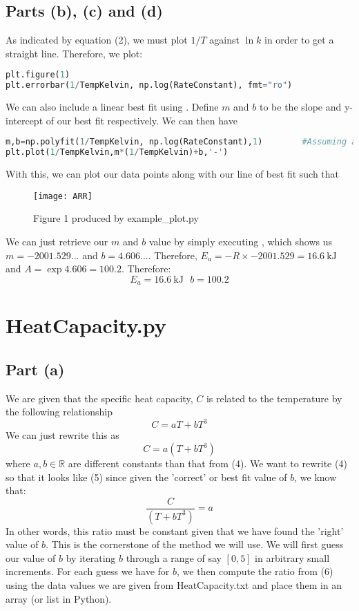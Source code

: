 \documentclass[11pt, oneside]{article}
\begin{document}
\subsection{Parts (b), (c) and (d)}
As indicated by equation (2), we must plot $1/T$ against $\ln{k}$ in order to get a straight line. Therefore, we plot:
\begin{lstlisting}[language=Python, caption=Plotting RateT.txt in an Arrhenius plot]
plt.figure(1)
plt.errorbar(1/TempKelvin, np.log(RateConstant), fmt="ro")		
\end{lstlisting}
We can also include a linear best fit using . Define $m$ and $b$ to be the slope and y-intercept of our best fit respectively. We can then have
\begin{lstlisting}[language=Python, caption=Determining and plotting the line of best fit (linear regression)]
m,b=np.polyfit(1/TempKelvin, np.log(RateConstant),1)		#Assuming a linear best fit
plt.plot(1/TempKelvin,m*(1/TempKelvin)+b,'-')		
\end{lstlisting}
With this, we can plot our data points along with our line of best fit such that
\begin{figure}[H]
\texttt{[image: ARR]}
\centering
\caption{Figure 1 produced by example\_plot.py}
\end{figure}
\noindent
We can just retrieve our $m$ and $b$ value by simply executing , which shows us $m=-2001.529...$ and $b=4.606...$. Therefore, $E_a=-R\times -2001.529=16.6\ \text{kJ}$ and $A=\exp{4.606}=100.2$. Therefore:
\begin{equation}
\boxed{E_a=16.6\ \text{kJ}}\ \ \ \boxed{b=100.2}
\end{equation}
\newpage
\section{HeatCapacity.py}
\subsection{Part (a)}
We are given that the specific heat capacity, $C$ is related to the temperature by the following relationship
\begin{equation}
C=aT+bT^3
\end{equation}
We can just rewrite this as
\begin{equation}
C=a(T+bT^3)
\end{equation}
where $a,b\in\mathbb{R}$ are different constants than that from (4). We want to rewrite (4) so that it looks like (5) since given the 'correct' or best fit value of $b$, we know that:
\begin{equation}
\dfrac{C}{(T+bT^3)}=a
\end{equation}
In other words, this ratio must be constant given that we have found the 'right' value of $b$. This is the cornerstone of the method we will use. We will first guess our value of $b$ by iterating $b$ through a range of say $[0,5]$ in arbitrary small increments. For each guess we have  for $b$, we then compute the ratio from (6) using the data values we are given from HeatCapacity.txt and place them in an array (or list in Python). 
\end{document}
